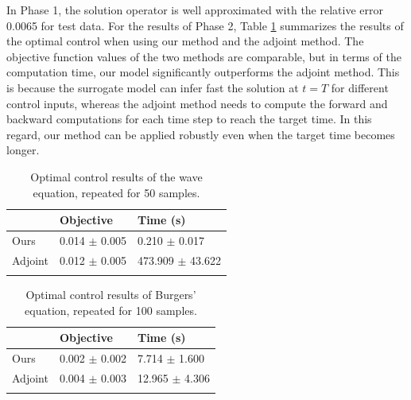 \documentclass[letterpaper]{article}
\begin{document}
In Phase 1, the solution operator is well approximated with the relative error 0.0065 for test data. For the results of Phase 2, Table \ref{wave_table} summarizes the results of the optimal control when using our method and the adjoint method. The objective function values of the two methods are comparable, but in terms of the computation time, our model significantly outperforms the adjoint method. This is because the surrogate model can infer fast the solution at $t=T$ for different control inputs, whereas the adjoint method needs to compute the forward and backward computations for each time step to reach the target time. In this regard, our method can be applied robustly even when the target time becomes longer.





\begin{table}[t]
\centering
\begin{tabular}{lll}
    \Xhline{1pt}

            & Objective     & Time (s)  \\
    \hline
    Ours    & 0.014 $\pm$ 0.005   & 0.210 $\pm$ 0.017  \\
    Adjoint & 0.012 $\pm$ 0.005   & 473.909 $\pm$ 43.622  \\
    \Xhline{1pt}

\end{tabular}
\caption{Optimal control results of the wave equation, repeated for 50 samples.}
\label{wave_table}
\end{table}


\begin{table}[t]
\centering
\begin{tabular}{lll}
    \Xhline{1pt}

            & Objective     & Time (s)  \\
    \hline
    Ours & 0.002 $\pm$ 0.002  &  7.714 $\pm$ 1.600   \\
    Adjoint    & 0.004 $\pm$ 0.003      & 12.965 $\pm$ 4.306      \\
    \Xhline{1pt}

\end{tabular}
\caption{Optimal control results of Burgers' equation, repeated for 100 samples.}
    \label{burgers_table}
\end{table}
\end{document}
